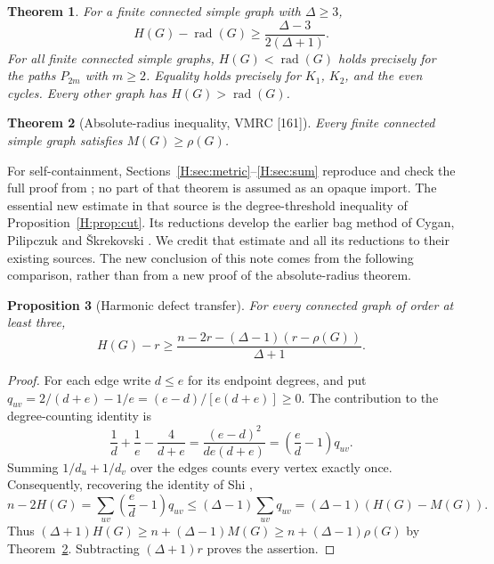 \documentclass[11pt,a4paper]{article}
\newtheorem{theorem}{Theorem}[section]
\newtheorem{proposition}[theorem]{Proposition}
\theoremstyle{remark}\newtheorem{remark}[theorem]{Remark}
\newcommand{\rad}{\operatorname{rad}}\newcommand{\diam}{\operatorname{diam}}\newcommand{\dist}{\operatorname{dist}}
\numberwithin{equation}{section}
\begin{document}
\begin{theorem}\label{H:thm:harmonic}
For a finite connected simple graph with $\Delta\ge3$,
\begin{equation}\label{H:eq:harmonicbound}
 H(G)-\rad(G)\ge\frac{\Delta-3}{2(\Delta+1)}.
\end{equation}
For all finite connected simple graphs, $H(G)<\rad(G)$ holds precisely
for the paths $P_{2m}$ with $m\ge2$. Equality holds precisely for
$K_1$, $K_2$, and the even cycles. Every other graph has $H(G)>\rad(G)$.
\end{theorem}

\begin{theorem}[Absolute-radius inequality, VMRC {\rm[161]}]\label{H:thm:abs}
Every finite connected simple graph satisfies $M(G)\ge\rho(G)$.
\end{theorem}
For self-containment, Sections~\ref{H:sec:metric}--\ref{H:sec:sum} reproduce
and check the full proof from \cite{H:VMRC161}; no part of that theorem
is assumed as an opaque import. The essential new estimate in that
source is the degree-threshold inequality of Proposition~\ref{H:prop:cut}.
Its reductions develop the earlier bag method of Cygan, Pilipczuk and
\v{S}krekovski \cite{H:CPS}. We credit that estimate and all its reductions
to their existing sources. The new conclusion of this note comes from
the following comparison, rather than from a new proof of the
absolute-radius theorem.

\begin{proposition}[Harmonic defect transfer]\label{H:prop:htransfer}
For every connected graph of order at least three,
\begin{equation}\label{H:eq:sharptransfer}
 H(G)-r\ge\frac{n-2r-(\Delta-1)(r-\rho(G))}{\Delta+1}.
\end{equation}
\end{proposition}
\begin{proof}
For each edge write $d\le e$ for its endpoint degrees, and put
$q_{uv}=2/(d+e)-1/e=(e-d)/[e(d+e)]\ge0$. The contribution to the
degree-counting identity is
\[
 \frac1d+\frac1e-\frac4{d+e}
 =\frac{(e-d)^2}{de(d+e)}
 =\left(\frac ed-1\right)q_{uv}.
\]
Summing $1/d_u+1/d_v$ over the edges counts every vertex exactly once.
Consequently, recovering the identity of Shi \cite[Theorem~3.3]{H:Shi},
\[
 n-2H(G)
 =\sum_{uv}\left(\frac ed-1\right)q_{uv}
 \le(\Delta-1)\sum_{uv}q_{uv}
 =(\Delta-1)(H(G)-M(G)).
\]
Thus $(\Delta+1)H(G)\ge n+(\Delta-1)M(G)
\ge n+(\Delta-1)\rho(G)$ by Theorem~\ref{H:thm:abs}.
Subtracting $(\Delta+1)r$ proves the assertion.
\end{proof}
\end{document}
